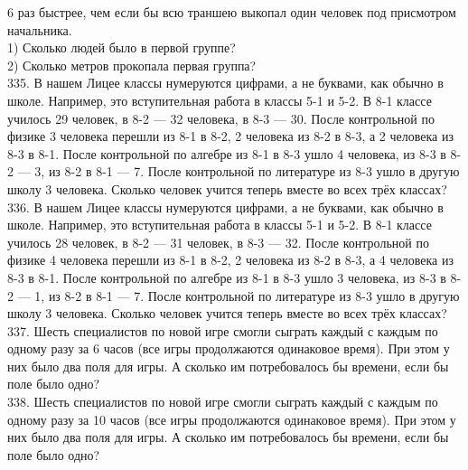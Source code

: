 \documentclass[12pt]{article}
\begin{document}
6 раз быстрее, чем если бы всю траншею выкопал один человек под присмотром начальника.\\
1) Сколько людей было в первой группе?\\
2) Сколько метров прокопала первая группа?\\
335. В нашем Лицее классы нумеруются цифрами, а не буквами, как обычно в школе. Например, это вступительная работа в классы 5-1 и 5-2. В 8-1 классе училось 29 человек, в 8-2 --- 32 человека, в 8-3 --- 30. После контрольной по физике 3 человека перешли из 8-1 в 8-2, 2 человека из 8-2 в 8-3, а 2 человека из 8-3 в 8-1. После контрольной по алгебре из 8-1 в 8-3 ушло 4 человека, из 8-3 в 8-2 --- 3, из 8-2 в 8-1 --- 7. После контрольной по литературе из 8-3 ушло в другую школу 3 человека. Сколько человек учится теперь вместе во всех трёх классах?\\
336. В нашем Лицее классы нумеруются цифрами, а не буквами, как обычно в школе. Например, это вступительная работа в классы 5-1 и 5-2. В 8-1 классе училось 28 человек, в 8-2 --- 31 человек, в 8-3 --- 32. После контрольной по физике 4 человека перешли из 8-1 в 8-2, 2 человека из 8-2 в 8-3, а 4 человека из 8-3 в 8-1. После контрольной по алгебре из 8-1 в 8-3 ушло 3 человека, из 8-3 в 8-2 --- 1, из 8-2 в 8-1 --- 7. После контрольной по литературе из 8-3 ушло в другую школу 3 человека. Сколько человек учится теперь вместе во всех трёх классах?\\
337. Шесть специалистов по новой игре смогли сыграть каждый с каждым по одному разу за 6 часов (все игры продолжаются одинаковое время). При этом у них было два поля для игры. А сколько им потребовалось бы времени, если бы поле было одно?\\
338. Шесть специалистов по новой игре смогли сыграть каждый с каждым по одному разу за 10 часов (все игры продолжаются одинаковое время). При этом у них было два поля для игры. А сколько им потребовалось бы времени, если бы поле было одно?
\newpage
\end{document}
